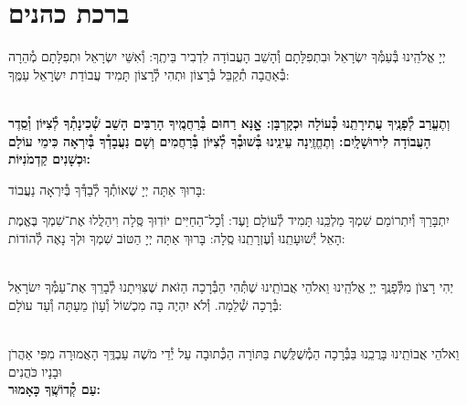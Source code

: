 \documentclass[twoside, openany, parskip=half, 11pt]{book}
\begin{document}
\\
\\


\sepline

\clearpage

\vspace{-1\baselineskip}
\section[ברכת כהנים]{ ברכת כהנים ‎}
\label{birkaskohanim}

יְיָ אֱלֹהֵֽינוּ בְּ֯עַמְּ֯ךָ יִשְׂרָאֵל וּבִתְפִלָּתָם וְ֯הָשֵׁב הָעֲבוֹדָה לִדְבִיר בֵּיתֶֽךָ: וְ֯אִשֵּׁי יִשְׂרָאֵל וּתְפִלָּתָם מְ֯הֵרָה בְּ֯אַהֲבָה תְ֯קַבֵּל בְּ֯רָצוֹן וּתְהִי לְ֯רָצוֹן תָּמִיד עֲבוֹדַת יִשְׂרָאֵל עַמֶּֽךָ:

\chazzanvkahal \\
\textbf{
וְתֶעֱרַב לְ֯פָנֶֽיךָ עֲתִירָתֵֽנוּ כְּ֯עוֹלָה וּכְקָרְבָּן:
אׇׇׇׇנָּא רַחוּם בְּ֯רַחֲמֶֽיךָ הָרַבִּים הָשֵׁב שְׁ֯כִינָתְ֯ךָ לְ֯צִיּוֹן וְ֯סֵֽדֶר הָעֲבוֹדָה לִירוּשָׁלָֽיִם:
וְתֶחֱזֶֽינָה עֵינֵֽינוּ בְּ֯שׁוּבְ֯ךָ לְ֯צִיּוֹן בְּ֯רַחֲמִים
וְשָׁם נַעֲבָדְ֯ךָ בְּ֯יִרְאָה כִּימֵי עוֹלָם וּכְשָׁנִים קַדְמֹנִיּוֹת:
}

\chazzan
בָּרוּךְ אַתָּה יְיָ שֶׁאוֹתְ֯ךָ לְ֯בַדְּ֯ךָ בְּ֯יִרְאָה נַעֲבוֹד:

\modim

יִתְבָּרַךְ וְ֯יִתְרוֹמַם שִׁמְךָ מַלְכֵּֽנוּ תָּמִיד לְ֯עוֹלָם וָעֶד: וְ֯כׇל־הַחַיִּים יוֹדֽוּךָ סֶּֽלָה וִיהַלֲלוּ אֶת־שִׁמְךָ בֶּאֱמֶת הָאֵל יְ֯שׁוּעָתֵֽנוּ וְ֯עֶזְרָתֵֽנוּ סֶֽלָה: בָּרוּךְ אַתָּה יְיָ הַטּוֹב שִׁמְךָ וּלְךָ נָאֶה לְ֯הוֹדוֹת:

\\
יְהִי רָצוׂן מִלְּ֯פָנֶֽךָ יְיָ אֱלֹהֵֽינוּ וֵאלֹהֵי אֲבוׂתֵֽינוּ שֶׁתְּ֯הִי הַבְּ֯רָכָה הַזֹּאת שֶׁצִּוִּיתָנוּ לְ֯בָרֵךְ אֶת־עַמְּ֯ךָ יִשׂרָאֵל בְּ֯רָכָה שְׁ֯לֵמָה. וְ֯לֹא יִהְיֶה בָּה מִכְשׁוֹל וְ֯עָוׂן מֵעַתָּה וְ֯עַד עוׂלָם:

\\
\shatz {}
וֵאלֹהֵי אֲבוֹתֵֽינוּ בָּרֲכֵֽנוּ בַּבְּ֯רָכָה הַמְ֯שֻׁלֶּֽשֶׁת בַּתּוֹרָה הַכְּ֯תוּבָה עַל יְ֯דֵי מֹשֶׁה עַבְדֶּֽךָ הָאֲמוּרָה מִפִּי אַהֲרֹן וּבָנָיו כֹּהֲנִים \\
\shatzvkahal
\textbf{עַם קְ֯דוֹשֶֽׁךָ כָּאָמוּר:}
\end{document}
